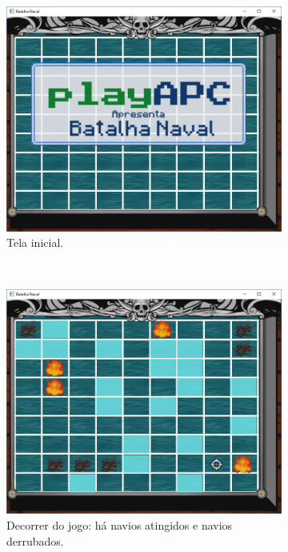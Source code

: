 \begin{renumerate}
\label{ex:cap02_ex29}
    \begin{figure}[H]
    \centering
    \begin{subfigure}[t]{0.3\textwidth}
        \centerline{\includegraphics[width=.9\textwidth]{img/cap2_ex29.png}}
        \caption{Tela inicial.}
        \label{fig:cap03_ex26}
    \end{subfigure}
    ~
    \begin{subfigure}[t]{0.3\textwidth}
        \centerline{\includegraphics[width=.9\textwidth]{img/cap2_ex29b.png}}
        \caption{Decorrer do jogo: há navios atingidos e navios derrubados.}
        \label{fig:cap03_ex26b}
    \end{subfigure}
    ~
    \begin{subfigure}[t]{0.3\textwidth}

\end{subfigure}
\end{figure}
\end{renumerate}
